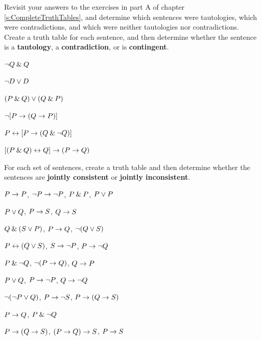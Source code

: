 \begin{small}
\problempart
Revisit your answers to the exercises in part A of chapter \ref{s:CompleteTruthTables}, and determine which sentences were tautologies, which were contradictions, and which were neither tautologies nor contradictions.\\


\problempart Create a truth table for each sentence, and then determine whether the sentence is a \textbf{tautology}, a \textbf{contradiction}, or is \textbf{contingent}.

\begin{earg}
\item ${\neg} Q \mathbin{\&} Q$ \vspace{.5ex}%
\item ${\neg} D \vee D$ \vspace{.5ex}%
\item $(P \mathbin{\&} Q) \vee (Q\mathbin{\&} P)$\vspace{.5ex} %
\item ${\neg}[P \rightarrow (Q \rightarrow P)]$\vspace{.5ex} %
\item $P \leftrightarrow [P \rightarrow (Q \mathbin{\&} {\neg} Q)]$ \vspace{.5ex}%
\item $[(P \mathbin{\&} Q) \leftrightarrow Q] \rightarrow (P \rightarrow Q)$ \vspace{.5ex}%
\end{earg}


\problempart
\label{pr.TT.consistent}
For each set of sentences, create a truth table and then determine whether the sentences are \textbf{jointly consistent} or \textbf{jointly inconsistent}.
\begin{earg}
\item $P\rightarrow P$, ${\neg} P \rightarrow {\neg} P$, $P\mathbin{\&} P$, $P\vee P$ %
\item $P\vee Q$, $P\rightarrow S$, $Q\rightarrow S$ %
\item $Q\mathbin{\&}(S\vee P)$, $P\rightarrow Q$, ${\neg}(Q\vee S)$  %
\item $P\leftrightarrow(Q\vee S)$, $S\rightarrow {\neg} P$, $P\rightarrow {\neg} Q$ %

\item $P \mathbin{\&} {\neg} Q$, ${\neg}(P \rightarrow Q)$, $Q \rightarrow P$\vspace{.5ex} %
\item $P \vee Q$, $P \rightarrow {\neg} P$, $Q \rightarrow {\neg} Q$ \vspace{.5ex}%
\item ${\neg}({\neg} P \vee Q) $, $P \rightarrow {\neg} S$, $P \rightarrow (Q \rightarrow S)$\vspace{.5ex} %
\item $P \rightarrow Q$, $P \mathbin{\&} {\neg} Q$\vspace{.5ex} %
\item $P \rightarrow (Q \rightarrow S)$, $(P \rightarrow Q) \rightarrow S$, $P \rightarrow S$\vspace{.5ex} %


\end{earg}
\end{small}
